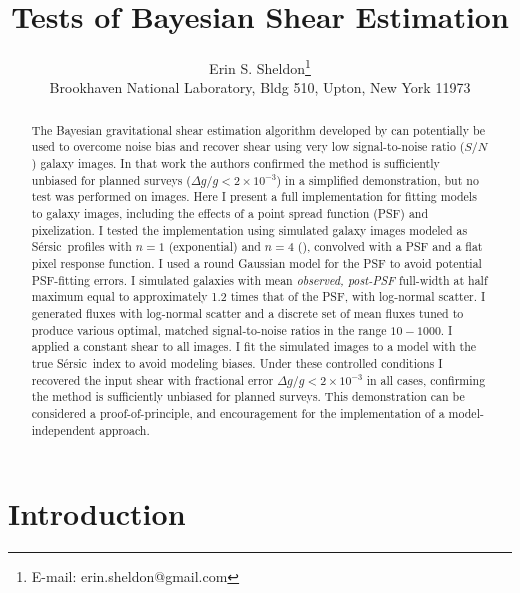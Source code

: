\documentclass[usegraphicx,usenatbib]{mn2e}
\newcommand{\sn}{$S/N$}
\newcommand{\sersic}{S\'{e}rsic}
\begin{document}
\title{Tests of Bayesian Shear Estimation}

\author[Erin S. Sheldon]{Erin S. Sheldon\thanks{E-mail: erin.sheldon@gmail.com}\\
Brookhaven National Laboratory, Bldg 510, Upton, New York 11973}

\maketitle

\begin{abstract}

The Bayesian gravitational shear estimation algorithm developed by \cite{ba14}
can potentially be used to overcome noise bias and recover shear using very low
signal-to-noise ratio (\sn) galaxy images.  In that work the authors confirmed
the method is sufficiently unbiased for planned surveys ($\Delta g/g < 2 \times
10^{-3}$) in a simplified demonstration, but no test was performed on images.
Here I present a full implementation for fitting models to galaxy images,
including the effects of a point spread function (PSF) and pixelization.  I
tested the implementation using simulated galaxy images modeled as \sersic\
profiles with $n=1$ (exponential) and $n=4$ (\devauc), convolved with a PSF and
a flat pixel response function.  I used a round Gaussian model for the PSF to
avoid potential PSF-fitting errors. I simulated galaxies with mean {\it
observed, post-PSF} full-width at half maximum equal to approximately 1.2 times
that of the PSF, with log-normal scatter.  I generated fluxes with
log-normal scatter and a discrete set of mean fluxes tuned to produce various
optimal, matched signal-to-noise ratios in the range $10-1000$.  I applied a
constant shear to all images. I fit the simulated images to a model with the
true \sersic\ index to avoid modeling biases.   Under these controlled
conditions I recovered the input shear with fractional error $\Delta g/g < 2
\times 10^{-3}$ in all cases, confirming the method is sufficiently unbiased
for planned surveys.  This demonstration can be considered a
proof-of-principle, and encouragement for the implementation of a
model-independent approach.


\end{abstract}

\section{Introduction} \label{sec:intro}
\end{document}
